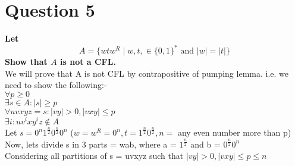 \documentclass{article}
\begin{document}
\section{Question 5}
\textbf{Let $$A = \{wtw^R\mid w,t, \in \{0,1\}^* \text{ \ and \ } |w| = |t|\}$$ Show that $A$ is not a CFL. }\\

We will prove that A is not CFL by contrapositive of pumping lemma. i.e. we need to show the following:- \\
$\forall p \geq 0$ \\
$\exists s \in A : |s| \geq p $ \\
$\forall uvxyz = s : |vy| > 0, |vxy| \leq p$\\
$\exists i : uv^ixy^iz \notin A$\\

Let $s = 0^n 1^{\frac{n}{2}} 0^{\frac{n}{2}} 0^n$ ($w = w^R = 0^n, t = 1^{\frac{n}{2}} 0^{\frac{n}{2}}, n = $ any even number more than p)\\
Now, lets divide s in 3 parts = wab, where a = $1^{\frac{n}{2}}$ and b = $0^{\frac{n}{2}} 0^n$\\
Considering all partitions of s = uvxyz such that $|vy| > 0, |vxy| \leq p \leq n$\\
\end{document}
